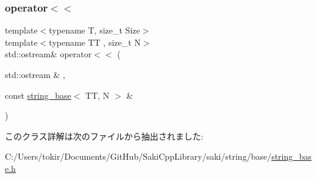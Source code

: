 \subsubsection{\texorpdfstring{operator$<$$<$}{operator<<}}
{\footnotesize\ttfamily template$<$typename T, size\+\_\+t Size$>$ \\
template$<$typename TT , size\+\_\+t N$>$ \\
std\+::ostream\& operator$<$$<$ (\begin{DoxyParamCaption}\item[{std\+::ostream \&}]{,  }\item[{const \mbox{\hyperlink{classsaki_1_1string__base}{string\+\_\+base}}$<$ TT, N $>$ \&}]{ }\end{DoxyParamCaption})\hspace{0.3cm}{\ttfamily [friend]}}



このクラス詳解は次のファイルから抽出されました\+:\begin{DoxyCompactItemize}
\item 
C\+:/\+Users/tokir/\+Documents/\+Git\+Hub/\+Saki\+Cpp\+Library/saki/string/base/\mbox{\hyperlink{string__base_8h}{string\+\_\+base.\+h}}\end{DoxyCompactItemize}

